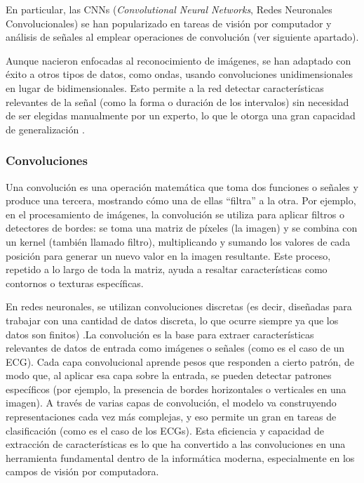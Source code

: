 En particular, las CNNs (\emph{Convolutional Neural Networks}, Redes Neuronales Convolucionales) se han popularizado en tareas de visión por computador y análisis de señales al emplear operaciones de convolución (ver siguiente apartado).

Aunque nacieron enfocadas al reconocimiento de imágenes, se han adaptado con éxito a otros tipos de datos, como ondas, usando convoluciones unidimensionales en lugar de bidimensionales. Esto permite a la red detectar características relevantes de la señal (como la forma o duración de los intervalos) sin necesidad de ser elegidas manualmente por un experto, lo que le otorga una gran capacidad de generalización \citep{hannun_cardiologist_2019}.

\subsubsection{Convoluciones}
Una convolución es una operación matemática que toma dos funciones o señales y produce una tercera, mostrando cómo una de ellas “filtra” a la otra. Por ejemplo, en el procesamiento de imágenes, la convolución se utiliza para aplicar filtros o detectores de bordes: se toma una matriz de píxeles (la imagen) y se combina con un kernel (también llamado filtro), multiplicando y sumando los valores de cada posición para generar un nuevo valor en la imagen resultante. Este proceso, repetido a lo largo de toda la matriz, ayuda a resaltar características como contornos o texturas específicas.

En redes neuronales, se utilizan convoluciones discretas (es decir, diseñadas para trabajar con una cantidad de datos discreta, lo que ocurre siempre ya que los datos son finitos) .La convolución es la base para extraer características relevantes de datos de entrada como imágenes o señales (como es el caso de un ECG). Cada capa convolucional aprende pesos que responden a cierto patrón, de modo que, al aplicar esa capa sobre la entrada, se pueden detectar patrones específicos (por ejemplo, la presencia de bordes horizontales o verticales en una imagen). A través de varias capas de convolución, el modelo va construyendo representaciones cada vez más complejas, y eso permite un gran en tareas de clasificación (como es el caso de los ECGs). Esta eficiencia y capacidad de extracción de características es lo que ha convertido a las convoluciones en una herramienta fundamental dentro de la informática moderna, especialmente en los campos de visión por computadora.

